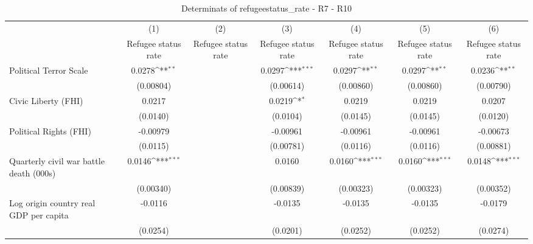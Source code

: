 \begin{table}[htbp]\centering
\def\sym#1{\ifmmode^{#1}\else\(^{#1}\)\fi}
\caption{Determinats of refugeestatus\_rate - R7 - R10}
\begin{tabular}{l*{6}{c}}
\hline\hline
                    &\multicolumn{1}{c}{(1)}&\multicolumn{1}{c}{(2)}&\multicolumn{1}{c}{(3)}&\multicolumn{1}{c}{(4)}&\multicolumn{1}{c}{(5)}&\multicolumn{1}{c}{(6)}\\
                    &\multicolumn{1}{c}{Refugee status rate}&\multicolumn{1}{c}{Refugee status rate}&\multicolumn{1}{c}{Refugee status rate}&\multicolumn{1}{c}{Refugee status rate}&\multicolumn{1}{c}{Refugee status rate}&\multicolumn{1}{c}{Refugee status rate}\\
\hline
Political Terror Scale&      0.0278\sym{**} &                     &      0.0297\sym{***}&      0.0297\sym{**} &      0.0297\sym{**} &      0.0236\sym{**} \\
                    &   (0.00804)         &                     &   (0.00614)         &   (0.00860)         &   (0.00860)         &   (0.00790)         \\
[1em]
Civic Liberty (FHI) &      0.0217         &                     &      0.0219\sym{*}  &      0.0219         &      0.0219         &      0.0207         \\
                    &    (0.0140)         &                     &    (0.0104)         &    (0.0145)         &    (0.0145)         &    (0.0120)         \\
[1em]
Political Rights (FHI)&    -0.00979         &                     &    -0.00961         &    -0.00961         &    -0.00961         &    -0.00673         \\
                    &    (0.0115)         &                     &   (0.00781)         &    (0.0116)         &    (0.0116)         &   (0.00881)         \\
[1em]
Quarterly civil war battle death (000s)&      0.0146\sym{***}&                     &      0.0160         &      0.0160\sym{***}&      0.0160\sym{***}&      0.0148\sym{***}\\
                    &   (0.00340)         &                     &   (0.00839)         &   (0.00323)         &   (0.00323)         &   (0.00352)         \\
[1em]
Log origin country real GDP per capita&     -0.0116         &                     &     -0.0135         &     -0.0135         &     -0.0135         &     -0.0179         \\
                    &    (0.0254)         &                     &    (0.0201)         &    (0.0252)         &    (0.0252)         &    (0.0274)         \\

\end{tabular}
\end{table}
